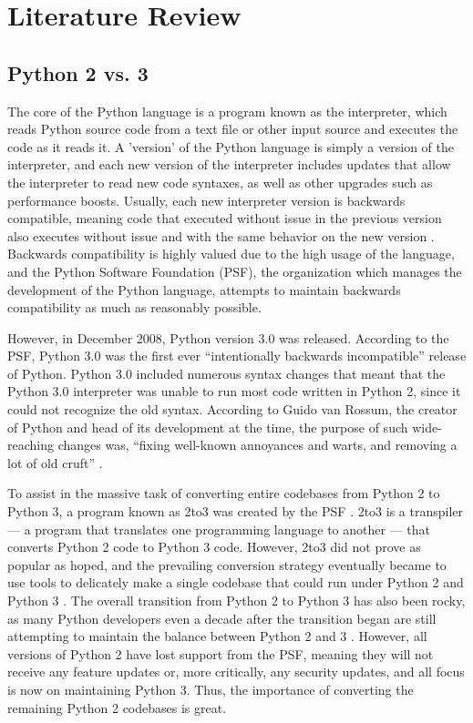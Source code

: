 \section{Literature Review}

\subsection{Python 2 vs. 3}
The core of the Python language is a program known as the interpreter, which reads Python source code from a text file or other input source and executes the code as it reads it. A 'version' of the Python language is simply a version of the interpreter, and each new version of the interpreter includes updates that allow the interpreter to read new code syntaxes, as well as other upgrades such as performance boosts. Usually, each new interpreter version is backwards compatible, meaning code that executed without issue in the previous version also executes without issue and with the same behavior on the new version \autocite{Malloy}. Backwards compatibility is highly valued due to the high usage of the language, and the Python Software Foundation (PSF), the organization which manages the development of the Python language, attempts to maintain backwards compatibility as much as reasonably possible.

However, in December 2008, Python version 3.0 was released. According to the PSF, Python 3.0 was the first ever “intentionally backwards incompatible” release of Python. Python 3.0 included numerous syntax changes that meant that the Python 3.0 interpreter was unable to run most code written in Python 2, since it could not recognize the old syntax. According to Guido van Rossum, the creator of Python and head of its development at the time, the purpose of such wide-reaching changes was, “fixing well-known annoyances and warts, and removing a lot of old cruft” \autocite{vanRossum}.

To assist in the massive task of converting entire codebases from Python 2 to Python 3, a program known as 2to3 was created by the PSF \autocite{2to3}. 2to3 is a transpiler --- a program that translates one programming language to another --- that converts Python 2 code to Python 3 code. However, 2to3 did not prove as popular as hoped, and the prevailing conversion strategy eventually became to use tools to delicately make a single codebase that could run under Python 2 and Python 3 \autocite{Malloy}. The overall transition from Python 2 to Python 3 has also been rocky, as many Python developers even a decade after the transition began are still attempting to maintain the balance between Python 2 and 3 \autocite{Malloy}. However, all versions of Python 2 have lost support from the PSF, meaning they will not receive any feature updates or, more critically, any security updates, and all focus is now on maintaining Python 3. Thus, the importance of converting the remaining Python 2 codebases is great.